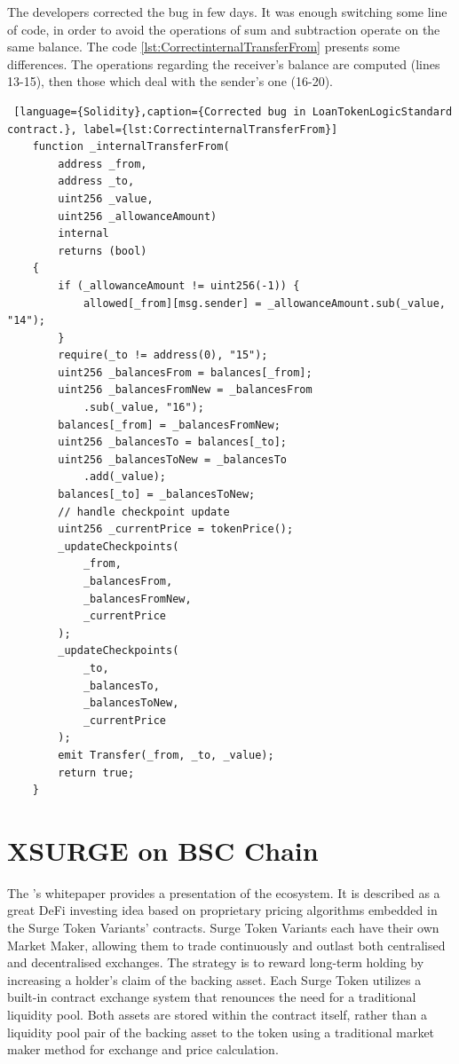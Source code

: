 The developers corrected the bug in few days. 
It was enough switching some line of code, in order to avoid the operations of sum and subtraction operate on the same balance. 
The code \autoref{lst:CorrectinternalTransferFrom} presents some differences. The operations regarding the receiver's balance are computed (lines 13-15), then those which deal with the sender's one (16-20).
\begin{lstlisting} [language={Solidity},caption={Corrected bug in LoanTokenLogicStandard contract.}, label={lst:CorrectinternalTransferFrom}]
    function _internalTransferFrom(
        address _from,
        address _to,
        uint256 _value,
        uint256 _allowanceAmount)
        internal
        returns (bool)
    {
        if (_allowanceAmount != uint256(-1)) {
            allowed[_from][msg.sender] = _allowanceAmount.sub(_value, "14");
        }
        require(_to != address(0), "15");
        uint256 _balancesFrom = balances[_from];
        uint256 _balancesFromNew = _balancesFrom
            .sub(_value, "16");
        balances[_from] = _balancesFromNew;
        uint256 _balancesTo = balances[_to];
        uint256 _balancesToNew = _balancesTo
            .add(_value);
        balances[_to] = _balancesToNew;
        // handle checkpoint update
        uint256 _currentPrice = tokenPrice();
        _updateCheckpoints(
            _from,
            _balancesFrom,
            _balancesFromNew,
            _currentPrice
        );
        _updateCheckpoints(
            _to,
            _balancesTo,
            _balancesToNew,
            _currentPrice
        );
        emit Transfer(_from, _to, _value);
        return true;
    }   
\end{lstlisting}


\section{XSURGE on BSC Chain}
\label{sec:Exploits:XSURGE}

The \citet{XSurgeWeb}'s whitepaper provides a presentation of the ecosystem.
It is described as a great DeFi investing idea based on proprietary pricing algorithms embedded in the Surge Token Variants' contracts.
Surge Token Variants each have their own Market Maker, allowing them to trade continuously and outlast both 
centralised and decentralised exchanges. 
The strategy is to reward long-term holding by increasing a
holder's claim of the backing asset. Each Surge Token utilizes a built-in contract exchange system that renounces the need for
a traditional liquidity pool. Both assets are stored within the contract itself, 
rather than a liquidity pool pair of the backing asset to the
token using a traditional market maker method for exchange and price calculation.

